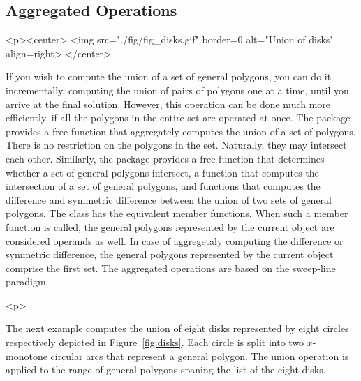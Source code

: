 \subsection{Aggregated Operations}
\label{bso_ssec:}
\lcHtml{\label{fig:disks}}
\begin{ccHtmlOnly}
  <p><center>
    <img src="./fig/fig_disks.gif" border=0 alt="Union of disks" align=right>
  </center>
\end{ccHtmlOnly}
If you wish to compute the union of a set of general polygons, you can
do it incrementally, computing the union of pairs of polygons one at a
time, until you arrive at the final solution. However, this operation
can be done much more efficiently, if all the polygons in the entire
set are operated at once. The package provides a free function that
aggregately computes the union of a set of polygons. There is no
restriction on the polygons in the set. Naturally, they may intersect
each other. Similarly, the package provides a free function that
determines whether a set of general polygons intersect, a function
that computes the intersection of a set of general polygons, and
functions that computes the difference and symmetric difference between
the union of two sets of general polygons. The class
 has the equivalent member functions. When
such a member function is called, the general polygons represented by
the current object are considered operands as well. In case of
aggregetaly computing the difference or symmetric difference, the
general polygons represented by the current object comprise the first
set. The aggregated operations are based on the sweep-line
paradigm. 

\begin{ccHtmlOnly}<p>\end{ccHtmlOnly}
The next example computes the union of eight disks represented by
eight circles respectively depicted in Figure~\ref{fig:disks}. Each
circle is split into two $x$-monotone circular arcs that represent a
general polygon. The union operation is applied to the range of
general polygons spaning the list of the eight disks.

